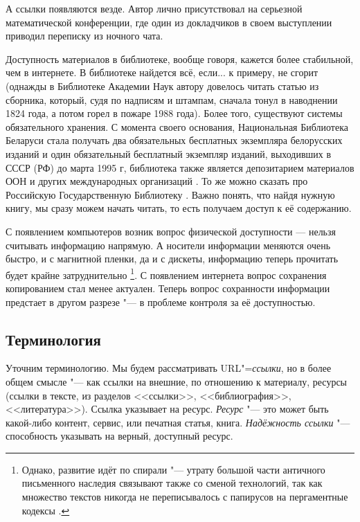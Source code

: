 \documentclass[10pt, a5paper]{article}
\begin{document}
А  ссылки  появляются  везде.  Автор  лично  присутствовал   на
серьезной математической конференции,  где  один  из  докладчиков  в
своем выступлении приводил переписку из  ночного  чата.

Доступность материалов  в  библиотеке,  вообще  говоря,  кажется
более стабильной,  чем  в  интернете.  В  библиотеке найдется всё,
если... к примеру, не сгорит (однажды в Библиотеке Академии  Наук 
\cite{AY2}
автору довелось читать статью из сборника, который, судя  по  надписям  и  штампам,
сначала тонул в наводнении 1824 года, а потом горел  в  пожаре  1988
года). Более того,  существуют  системы  обязательного  хранения. 
С момента своего основания, Национальная Библиотека Беларуси
стала получать два обязательных бесплатных экземпляра белорусских 
изданий и один обязательный бесплатный экземпляр изданий, 
выходивших в СССР (РФ) до марта 1995 г, библиотека также является 
депозитарием материалов ООН и других 
международных организаций \cite{AY3}. То же можно сказать про 
Российскую    Государственную    Библиотеку \cite{AY4}. 
Важно  понять,  что
найдя нужную книгу, мы сразу можем начать читать, то  есть  получаем
доступ к её содержанию.

    С появлением компьютеров возник вопрос физической доступности  —
нельзя  считывать  информацию  напрямую.   А   носители   информации
меняются очень быстро,  и  с  магнитной  пленки,  да  и  с  дискеты,
информацию  теперь  прочитать  будет   крайне   затруднительно
\footnote{Однако, развитие идёт по спирали "--- утрату большой части
античного письменного наследия связывают также со сменой
технологий, так как множество текстов никогда не переписывалось с
папирусов на пергаментные кодексы \cite{AY5}.}. 
С появлением  интернета  вопрос  сохранения  копированием  стал  менее
актуален. Теперь вопрос сохранности информации  предстает  в  другом
разрезе "--- в проблеме контроля за её доступностью.

\subsection*{Терминология}

Уточним терминологию. Мы будем рассматривать URL"=\textit{ссылки}, но в  более
общем смысле "--- как  ссылки  на  внешние,  по  отношению  к  материалу,
ресурсы       (ссылки       в       тексте,       из        разделов
<<ссылки>>, <<библиография>>, <<литература>>). Ссылка указывает  на  ресурс.
\textit{Ресурс} "--- это может быть какой-либо  контент,  сервис,  или  печатная
статья, книга. 
\textit{Надёжность ссылки} "--- способность указывать на верный, доступный 
ресурс.  
\end{document}
